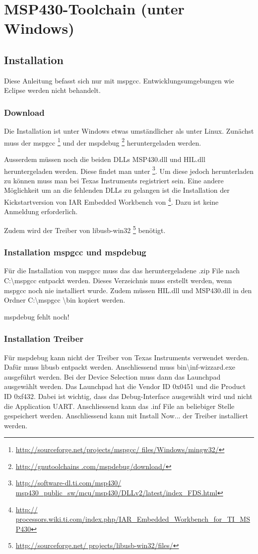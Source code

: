 \section{MSP430-Toolchain (unter Windows)}
\subsection{Installation}
Diese Anleitung befasst sich nur mit mspgcc. Entwicklungsumgebungen wie Eclipse 
werden nicht behandelt. 
\subsubsection{Download}
Die Installation ist unter Windows etwas umständlicher als unter Linux. 
Zunächst muss der mspgcc \footnote{\url{http://sourceforge.net/projects/mspgcc/
files/Windows/mingw32/}} und der mspdebug \footnote{\url{http://gnutoolchains
.com/mspdebug/download/}} heruntergeladen werden. 

Ausserdem müssen noch die beiden DLLs MSP430.dll und HIL.dll heruntergeladen 
werden. Diese findet man unter \footnote{\url{http://software-dl.ti.com/msp430/
msp430_public_sw/mcu/msp430/DLLv2/latest/index_FDS.html}}. Um diese jedoch 
herunterladen zu können muss man bei Texas Instruments registriert sein. Eine 
andere Möglichkeit um an die fehlenden DLLs zu gelangen ist die Installation 
der Kickstartversion von IAR Embedded Workbench von \footnote{\url{http://
processors.wiki.ti.com/index.php/IAR_Embedded_Workbench_for_TI_MSP430}}. Dazu 
ist keine Anmeldung erforderlich. 

Zudem wird der Treiber von libusb-win32 \footnote{\url{http://sourceforge.net/
projects/libusb-win32/files/}} benötigt. 

\subsubsection{Installation mspgcc und mspdebug}
Für die Installation von mspgcc muss das das heruntergeladene .zip File 
nach C:\textbackslash mspgcc entpackt werden. Dieses Verzeichnis muss erstellt 
werden, wenn mspgcc noch nie installiert wurde. Zudem müssen HIL.dll und 
MSP430.dll in den Ordner C:\textbackslash mspgcc \textbackslash bin kopiert 
werden. 

mspdebug fehlt noch!

\subsubsection{Installation Treiber}
Für mspdebug kann nicht der Treiber von Texas Instruments verwendet werden. 
Dafür muss libusb entpackt werden. Anschliessend muss 
bin\textbackslash inf-wizzard.exe ausgeführt werden. Bei der Device Selection
muss dann das Launchpad ausgewählt werden. Das Launchpad hat die Vendor ID 
0x0451 und die Product ID 0xf432. Dabei ist wichtig, dass das Debug-Interface
ausgewählt wird und nicht die Application UART. Anschliessend kann das .inf 
File an beliebiger Stelle gespeichert werden. Anschliessend kann mit Install 
Now... der Treiber installiert werden. 

